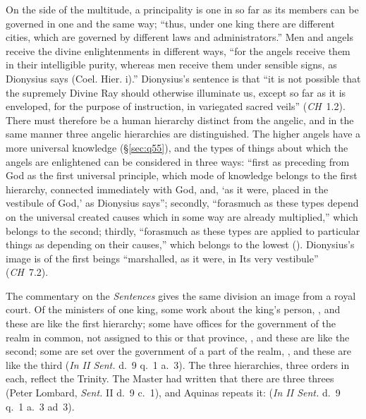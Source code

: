 On the side of the multitude, a principality is one in so far as its
members can be governed in one and the same way; ``thus, under one king
there are different cities, which are governed by different laws and
administrators.'' Men and angels receive the divine enlightenments in
different ways, ``for the angels receive them in their intelligible purity,
whereas men receive them under sensible signs, as Dionysius says (Coel.
Hier. i).'' Dionysius's sentence is that ``it is not possible that the
supremely Divine Ray should otherwise illuminate us, except so far as it is
enveloped, for the purpose of instruction, in variegated sacred veils''
(\emph{CH}~1.2). There must therefore be a human hierarchy distinct from
the angelic, and in the same manner three angelic hierarchies are
distinguished. The higher angels have a more universal knowledge
(\S\ref{sec:q55}), and the types of things about which the angels are
enlightened can be considered in three ways: ``first as preceding from God
as the first universal principle, which mode of knowledge belongs to the
first hierarchy, connected immediately with God, and, `as it were, placed in
the vestibule of God,' as Dionysius says''; secondly, ``forasmuch as these
types depend on the universal created causes which in some way are already
multiplied,'' which belongs to the second; thirdly, ``forasmuch as these
types are applied to particular things as depending on their causes,'' which
belongs to the lowest (). Dionysius's image is of
the first beings ``marshalled, as it were, in Its very vestibule''
(\emph{CH}~7.2).

The commentary on the \emph{Sentences} gives the same division an image from
a royal court. Of the ministers of one king, some work about the king's
person, , and these
are like the first hierarchy; some have offices for the government of the
realm in common, not assigned to this or that province, , and these are
like the second; some are set over the government of a part of the realm,
, and these
are like the third (\emph{In II Sent.} d.~9 q.~1 a.~3). The three
hierarchies, three orders in each, reflect the Trinity. The Master had
written that there are three threes  (Peter Lombard, \emph{Sent.} II d.~9 c.~1), and
Aquinas repeats it:  (\emph{In II Sent.} d.~9
q.~1 a.~3 ad~3).

